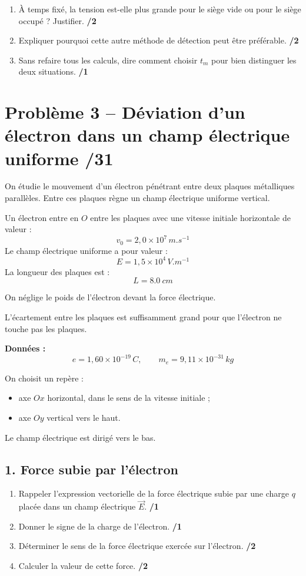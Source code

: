 \documentclass[11pt,a4paper]{article}
\begin{document}
\begin{enumerate}
    \item À temps fixé, la tension est-elle plus grande pour le siège vide ou pour le siège occupé ? Justifier. \hfill \textbf{/2}
    \item Expliquer pourquoi cette autre méthode de détection peut être préférable. \hfill \textbf{/2}
    \item Sans refaire tous les calculs, dire comment choisir \(t_m\) pour bien distinguer les deux situations. \hfill \textbf{/1}
\end{enumerate}

\vspace{1em}

\section*{Problème 3 -- Déviation d'un électron dans un champ électrique uniforme \hfill /31}

On étudie le mouvement d'un électron pénétrant entre deux plaques métalliques parallèles. Entre ces plaques règne un champ électrique uniforme vertical.

Un électron entre en \(O\) entre les plaques avec une vitesse initiale horizontale de valeur :
\[
v_0 = 2{,}0\times 10^7\,\si{m.s^{-1}}
\]
Le champ électrique uniforme a pour valeur :
\[
E = 1{,}5\times 10^4\,\si{V.m^{-1}}
\]
La longueur des plaques est :
\[
L = \SI{8.0}{cm}
\]

On néglige le poids de l'électron devant la force électrique.

L’écartement entre les plaques est suffisamment grand pour que l’électron ne touche pas les plaques. 

\medskip

\noindent\textbf{Données :}
\[
e = 1{,}60\times 10^{-19}\,\si{C}, \qquad m_e = 9{,}11\times 10^{-31}\,\si{kg}
\]

On choisit un repère :
\begin{itemize}
    \item axe \(Ox\) horizontal, dans le sens de la vitesse initiale ;
    \item axe \(Oy\) vertical vers le haut.
\end{itemize}

Le champ électrique est dirigé vers le bas.

\subsection*{1. Force subie par l'électron}
\begin{enumerate}
    \item Rappeler l'expression vectorielle de la force électrique subie par une charge \(q\) placée dans un champ électrique \(\vec{E}\). \hfill \textbf{/1}
    \item Donner le signe de la charge de l'électron. \hfill \textbf{/1}
    \item Déterminer le sens de la force électrique exercée sur l'électron. \hfill \textbf{/2}
    \item Calculer la valeur de cette force. \hfill \textbf{/2}
\end{enumerate}
\end{document}

